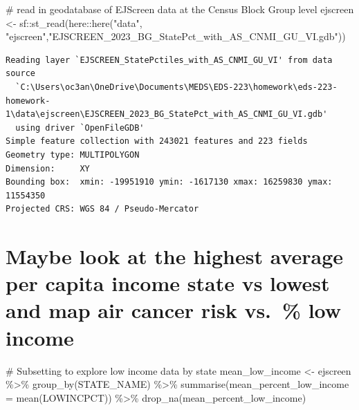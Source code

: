 \documentclass[
  letterpaper,
  DIV=11,
  numbers=noendperiod]{scrartcl}
\newenvironment{Shaded}{\begin{snugshade}}{\end{snugshade}}
\newcommand{\AttributeTok}[1]{\textcolor[rgb]{0.40,0.45,0.13}{#1}}
\newcommand{\CommentTok}[1]{\textcolor[rgb]{0.37,0.37,0.37}{#1}}
\newcommand{\FunctionTok}[1]{\textcolor[rgb]{0.28,0.35,0.67}{#1}}
\newcommand{\NormalTok}[1]{\textcolor[rgb]{0.00,0.23,0.31}{#1}}
\newcommand{\OtherTok}[1]{\textcolor[rgb]{0.00,0.23,0.31}{#1}}
\newcommand{\SpecialCharTok}[1]{\textcolor[rgb]{0.37,0.37,0.37}{#1}}
\newcommand{\StringTok}[1]{\textcolor[rgb]{0.13,0.47,0.30}{#1}}
\begin{document}
\begin{Shaded}
\begin{Highlighting}[]
\CommentTok{\# read in geodatabase of EJScreen data at the Census Block Group level}
\NormalTok{ejscreen }\OtherTok{\textless{}{-}}\NormalTok{ sf}\SpecialCharTok{::}\FunctionTok{st\_read}\NormalTok{(here}\SpecialCharTok{::}\FunctionTok{here}\NormalTok{(}\StringTok{"data"}\NormalTok{, }\StringTok{"ejscreen"}\NormalTok{,}\StringTok{"EJSCREEN\_2023\_BG\_StatePct\_with\_AS\_CNMI\_GU\_VI.gdb"}\NormalTok{)) }
\end{Highlighting}
\end{Shaded}

\begin{verbatim}
Reading layer `EJSCREEN_StatePctiles_with_AS_CNMI_GU_VI' from data source 
  `C:\Users\oc3an\OneDrive\Documents\MEDS\EDS-223\homework\eds-223-homework-1\data\ejscreen\EJSCREEN_2023_BG_StatePct_with_AS_CNMI_GU_VI.gdb' 
  using driver `OpenFileGDB'
Simple feature collection with 243021 features and 223 fields
Geometry type: MULTIPOLYGON
Dimension:     XY
Bounding box:  xmin: -19951910 ymin: -1617130 xmax: 16259830 ymax: 11554350
Projected CRS: WGS 84 / Pseudo-Mercator
\end{verbatim}

\section{Maybe look at the highest average per capita income state vs
lowest and map air cancer risk vs.~\% low
income}\label{maybe-look-at-the-highest-average-per-capita-income-state-vs-lowest-and-map-air-cancer-risk-vs.-low-income}

\begin{Shaded}
\begin{Highlighting}[]
\CommentTok{\# Subsetting to explore low income data by state}
\NormalTok{mean\_low\_income }\OtherTok{\textless{}{-}}\NormalTok{ ejscreen }\SpecialCharTok{\%\textgreater{}\%} 
  \FunctionTok{group\_by}\NormalTok{(STATE\_NAME) }\SpecialCharTok{\%\textgreater{}\%} 
  \FunctionTok{summarise}\NormalTok{(}\AttributeTok{mean\_percent\_low\_income =} \FunctionTok{mean}\NormalTok{(LOWINCPCT)) }\SpecialCharTok{\%\textgreater{}\%} 
  \FunctionTok{drop\_na}\NormalTok{(mean\_percent\_low\_income)}
\end{Highlighting}
\end{Shaded}
\end{document}
